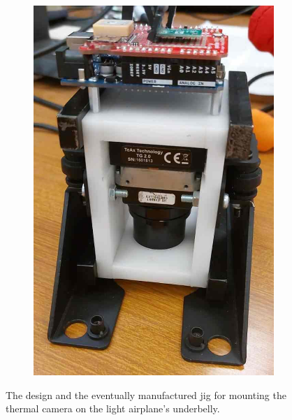 \begin{figure}[H]
\begin{subfigure}[b]{0.49\textwidth}
        \includegraphics[width=\textwidth]{../figs/data/camera_jig_actual.jpeg}
        \label{fig:manufactured}
    \end{subfigure}

    \caption{The design and the eventually manufactured jig for mounting the thermal camera on the light airplane's underbelly.}
    \label{fig:camera_jig}
\end{figure}


